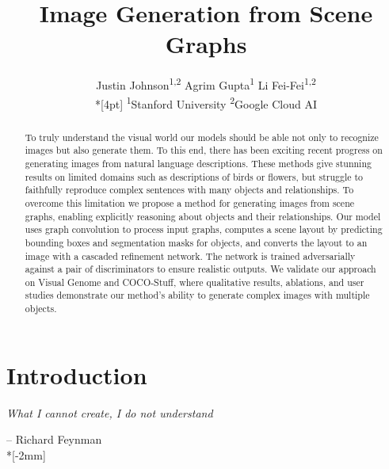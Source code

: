 \documentclass[10pt,twocolumn,letterpaper]{article}
\begin{document}
\title{Image Generation from Scene Graphs}

\author{
  Justin Johnson\textsuperscript{1,2}\footnotemark \hspace{2.5pc}
  Agrim Gupta\textsuperscript{1} \hspace{2.5pc}
  Li Fei-Fei\textsuperscript{1,2} \\*[4pt]
  \textsuperscript{1}Stanford University \hspace{2.5pc}
  \textsuperscript{2}Google Cloud AI
}

\maketitle
\renewcommand*{\thefootnote}{\fnsymbol{footnote}}
\setcounter{footnote}{1}
\renewcommand*{\thefootnote}{\arabic{footnote}}
\setcounter{footnote}{0}


\begin{abstract}
  To truly understand the visual world our models should be able not only to recognize images but also generate them. To this end, there has been exciting recent progress on generating images from natural language descriptions. These methods give stunning results on limited domains such as descriptions of birds or flowers, but struggle to faithfully reproduce complex sentences with many objects and relationships. To overcome this limitation we propose a method for generating images from scene graphs, enabling explicitly reasoning about objects and their relationships. Our model uses graph convolution to process input graphs, computes a scene layout by predicting bounding boxes and segmentation masks for objects, and converts the layout to an image with a cascaded refinement network. The network is trained adversarially against a pair of discriminators to ensure realistic outputs. We validate our approach on Visual Genome and COCO-Stuff, where qualitative results, ablations, and user studies demonstrate our method's ability to generate complex images with multiple objects.
 \end{abstract}
\vspace{-2mm}


\section{Introduction}
\noindent\emph{What I cannot create, I do not understand}

-- Richard Feynman \\*[-2mm]
\end{document}
